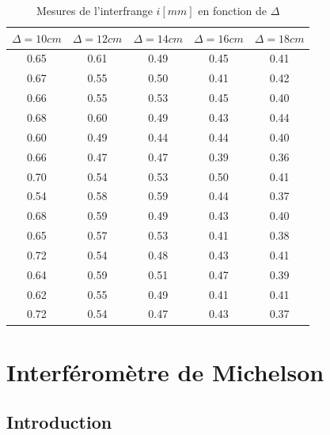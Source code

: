 \documentclass[11pt, openright]{book}
\begin{document}
			\begin{table}[ht!]
				\centering
				\begin{tabular}{|c|c|c|c|c|}
					\hline
					$\Delta =10cm$ & $\Delta =12cm$ & $\Delta =14cm$ & $\Delta =16cm$ & $\Delta =18cm$\\
					\hline
					0.65 & 0.61 & 0.49 & 0.45 & 0.41\\
					0.67 & 0.55 & 0.50 & 0.41 & 0.42\\
					0.66 & 0.55 & 0.53 & 0.45 & 0.40\\
					0.68 & 0.60 & 0.49 & 0.43 & 0.44\\
					0.60 & 0.49 & 0.44 & 0.44 & 0.40\\
					0.66 & 0.47 & 0.47 & 0.39 & 0.36\\
					0.70 & 0.54 & 0.53 & 0.50 & 0.41\\
					0.54 & 0.58 & 0.59 & 0.44 & 0.37\\
					0.68 & 0.59 & 0.49 & 0.43 & 0.40\\
					0.65 & 0.57 & 0.53 & 0.41 & 0.38\\
					0.72 & 0.54 & 0.48 & 0.43 & 0.41\\
					0.64 & 0.59 & 0.51 & 0.47 & 0.39\\
					0.62 & 0.55 & 0.49 & 0.41 & 0.41\\
					0.72 & 0.54 & 0.47 & 0.43 & 0.37\\
					\hline
				\end{tabular}
				\caption{Mesures de l'interfrange $i[mm]$ en fonction de $\Delta $}
			\end{table}

			

	\chapter{Interféromètre de Michelson}

		\section{Introduction}
\end{document}
